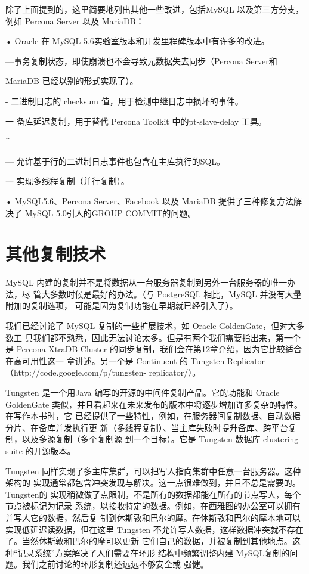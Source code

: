 除了上面提到的，这里简要地列出其他一些改进，包括MySQL 以及第三方分支，例如
Percona Server 以及 MariaDB：

• Oracle 在 MySQL 5.6实验室版本和开发里程碑版本中有许多的改进。

—事务复制状态，即使崩溃也不会导致元数据失去同步（Percona Server和

MariaDB 已经以别的形式实现了）。

- 二进制日志的 checksum 值，用于检测中继日志中损坏的事件。

一 备库延迟复制，用于替代 Percona Toolkit 中的pt-slave-delay 工具。

^

— 允许基于行的二进制日志事件也包含在主库执行的SQL。

一 实现多线程复制（并行复制）。

• MySQL5.6、Percona Server、Facebook 以及 MariaDB 提供了三种修复方法解决了
MySQL 5.0引人的GROUP COMMIT的问题。

\section{其他复制技术}
MySQL 内建的复制并不是将数据从一台服务器复制到另外一台服务器的唯一办法，尽
管大多数时候是最好的办法。（与 PostgreSQL 相比，MySQL 并没有大量附加的复制选项，
可能是因为复制功能在早期就已经引入了）。

我们已经讨论了 MySQL 复制的一些扩展技术，如 Oracle GoldenGate，但对大多数工
具我们都不熟悉，因此无法讨论太多。但是有两个我们需要指出来，第一个是 Percona
XtraDB Cluster 的同步复制，我们会在第12章介绍，因为它比较适合在高可用性这一
章讲述。另一个是 Continuent 的 Tungsten Replicator （http://code.google.com/p/tungsten-
replicator/）。

Tungsten 是一个用Java 编写的开源的中间件复制产品。它的功能和 Oracle GoldenGate
类似，并且看起来在未来发布的版本中将逐步增加许多复杂的特性。在写作本书时，它
已经提供了一些特性，例如，在服务器间复制数据、自动数据分片、在备库并发执行更
新（多线程复制）、当主库失败时提升备库、跨平台复制，以及多源复制（多个复制源
到一个目标）。它是 Tungsten 数据库 clustering suite 的开源版本。

Tungsten 同样实现了多主库集群，可以把写人指向集群中任意一台服务器。这种架构的
实现通常都包含冲突发现与解决。这一点很难做到，并且不总是需要的。Tungsten的
实现稍微做了点限制，不是所有的数据都能在所有的节点写人，每个节点被标记为记录
系统，以接收特定的数据。例如，在西雅图的办公室可以拥有并写人它的数据，然后复
制到休斯敦和巴尔的摩。在休斯敦和巴尔的摩本地可以实现低延迟读数据，但在这里
Tungsten 不允许写人数据，这样数据冲突就不存在了。当然休斯敦和巴尔的摩可以更新
它们自己的数据，并被复制到其他地点。这种“记录系统”方案解决了人们需要在环形
结构中频繁调整内建 MySQL复制的问题。我们之前讨论的环形复制还远远不够安全或
强健。

